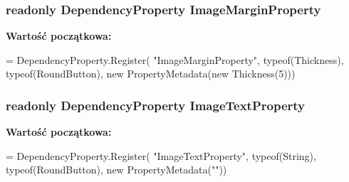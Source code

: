 \subsubsection[{Image\+Margin\+Property}]{\setlength{\rightskip}{0pt plus 5cm}readonly Dependency\+Property Image\+Margin\+Property\hspace{0.3cm}{\ttfamily [static]}}\label{a00050_a793a42ca02eeded5aa09845ece6b3c4b}
{\bfseries Wartość początkowa\+:}
\begin{DoxyCode}
=
        DependencyProperty.Register(
            \textcolor{stringliteral}{"ImageMarginProperty"},
            typeof(Thickness),
            typeof(RoundButton),
            \textcolor{keyword}{new} PropertyMetadata(\textcolor{keyword}{new} Thickness(5)))
\end{DoxyCode}
\hypertarget{a00050_ae70a0a6eccdba81ef06dd993a6342c15}{}
\subsubsection[{Image\+Text\+Property}]{\setlength{\rightskip}{0pt plus 5cm}readonly Dependency\+Property Image\+Text\+Property\hspace{0.3cm}{\ttfamily [static]}}\label{a00050_ae70a0a6eccdba81ef06dd993a6342c15}
{\bfseries Wartość początkowa\+:}
\begin{DoxyCode}
=
        DependencyProperty.Register(
            \textcolor{stringliteral}{"ImageTextProperty"},
            typeof(String),
            typeof(RoundButton),
            \textcolor{keyword}{new} PropertyMetadata(\textcolor{stringliteral}{""}))
\end{DoxyCode}
\hypertarget{a00050_a93ac0b8125606ef13cf6961a1b5ea8ab}{}
